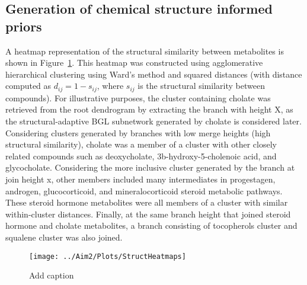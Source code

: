 \begin{DoubleSpace*}
\section{Generation of chemical structure informed priors}
A heatmap representation of the structural similarity between metabolites is shown in Figure~\ref{fig:heatmap}. This heatmap was constructed using agglomerative hierarchical clustering using Ward’s method and squared distances (with distance computed as $d_{ij}=1-s_{ij}$, where $s_{ij}$ is the structural similarity between compounds). For illustrative purposes, the cluster containing cholate was retrieved from the root dendrogram by extracting the branch with height X, as the structural-adaptive BGL subnetwork generated by cholate is considered later. Considering clusters generated by branches with low merge heights (high structural similarity), cholate was a member of a cluster with other closely related compounds such as deoxycholate, 3b-hydroxy-5-cholenoic acid, and glycocholate. Considering the more inclusive cluster generated by the branch at join height x, other members included many intermediates in progestagen, androgen, glucocorticoid, and mineralocorticoid steroid metabolic pathways. These steroid hormone metabolites were all members of a cluster with similar within-cluster distances. Finally, at the same branch height that joined steroid hormone and cholate metabolites, a branch consisting of tocopherols cluster and squalene cluster was also joined.
\end{DoubleSpace*}
	
\newpage
{}
\recalctypearea
\begin{figure}[ht]
	\texttt{[image: ../Aim2/Plots/StructHeatmaps]}
	\caption[Add caption]{Add caption \label{fig:heatmap} }
\end{figure}
\newpage
{}
\recalctypearea

